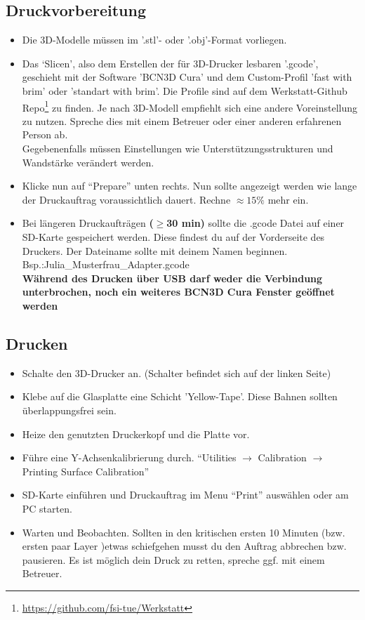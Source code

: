 \documentclass[a4paper]{article}
\begin{document}
\subsection{Druckvorbereitung}
\begin{itemize}
	\item Die 3D-Modelle müssen im '.stl'- oder '.obj'-Format vorliegen.
	\item Das ‘Slicen’, also dem Erstellen der für 3D-Drucker lesbaren '.gcode',  geschieht mit der Software 'BCN3D Cura' und dem Custom-Profil 'fast with brim' oder 'standart with brim'. Die Profile sind auf dem Werkstatt-Github Repo\footnote{\url{https://github.com/fsi-tue/Werkstatt}} zu finden.
	Je nach 3D-Modell empfiehlt sich eine andere Voreinstellung zu nutzen. Spreche dies mit einem Betreuer oder einer anderen erfahrenen Person ab.\\
	Gegebenenfalls müssen Einstellungen wie Unterstützungsstrukturen und Wandstärke verändert werden.
	\item Klicke nun auf "`Prepare"' unten rechts. Nun sollte angezeigt werden wie lange der Druckauftrag voraussichtlich dauert. Rechne $\approx 15\%$ mehr ein.
	\item Bei längeren Druckaufträgen \textbf{($\geq$30 min)} sollte die .gcode Datei auf einer SD-Karte gespeichert werden. Diese findest du auf der Vorderseite des Druckers. Der Dateiname sollte mit deinem Namen beginnen. Bsp.:Julia\_Musterfrau\_Adapter.gcode\\
	\textbf{Während des Drucken über USB darf weder die Verbindung unterbrochen, noch ein weiteres BCN3D Cura Fenster geöffnet werden}
\end{itemize}
\subsection{Drucken}
\begin{itemize}
	\item Schalte den 3D-Drucker an. (Schalter befindet sich auf der linken Seite)
	\item Klebe auf die Glasplatte eine Schicht 'Yellow-Tape'. Diese Bahnen sollten überlappungsfrei sein.
	\item Heize den genutzten Druckerkopf und die Platte vor.
	\item Führe eine Y-Achsenkalibrierung durch. "`Utilities  $\rightarrow$ Calibration $\rightarrow $Printing Surface Calibration"'
	\item SD-Karte einführen und Druckauftrag im Menu "`Print"' auswählen oder am PC starten.
	\item Warten und Beobachten. Sollten in den kritischen ersten 10 Minuten (bzw. ersten paar Layer )etwas schiefgehen musst du den Auftrag abbrechen bzw. pausieren. Es ist möglich dein Druck zu retten, spreche ggf. mit einem Betreuer.
\end{itemize}
\end{document}
